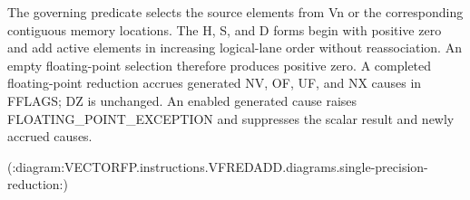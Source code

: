 The governing predicate selects the source elements from Vn or the
corresponding contiguous memory locations. The H, S, and D forms begin with
positive zero and add active elements in
increasing logical-lane order without reassociation. An empty floating-point
selection therefore produces positive zero. A completed floating-point
reduction accrues generated NV, OF, UF, and NX causes in FFLAGS; DZ is
unchanged. An enabled generated cause raises FLOATING\_POINT\_EXCEPTION and
suppresses the scalar result and newly accrued causes.

(:diagram:VECTORFP.instructions.VFREDADD.diagrams.single-precision-reduction:)
